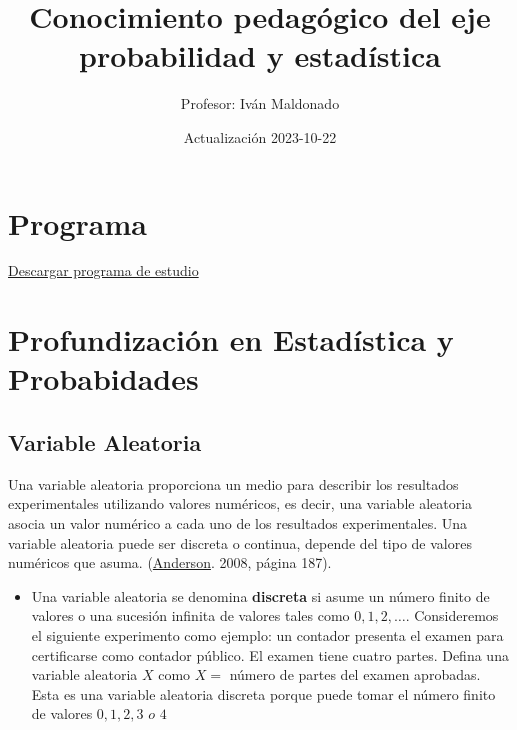 \documentclass[
]{book}
\title{Conocimiento pedagógico del eje probabilidad y estadística}
\author{Profesor: Iván Maldonado}
\date{Actualización 2023-10-22}
\providecommand{\tightlist}{%
  \setlength{\itemsep}{0pt}\setlength{\parskip}{0pt}}
\begin{document}
\maketitle

{
\setcounter{tocdepth}{1}
\tableofcontents
}
\hypertarget{programa}{%
\chapter*{Programa}\label{programa}}

\href{https://correouss-my.sharepoint.com/:b:/g/personal/imaldonadoc1_docente_uss_cl/EXfiKuJSO7JCle9L_86S0EMBeDkr3OyYHprvy0Rc0Jj4mQ?e=JcPOWy}{Descargar programa de estudio}

\hypertarget{profundizaciuxf3n-en-estaduxedstica-y-probabidades}{%
\chapter{Profundización en Estadística y Probabidades}\label{profundizaciuxf3n-en-estaduxedstica-y-probabidades}}

\hypertarget{variable-aleatoria}{%
\section{Variable Aleatoria}\label{variable-aleatoria}}

Una variable aleatoria proporciona un medio para describir los resultados experimentales utilizando valores numéricos, es decir, una variable aleatoria asocia un valor numérico a cada uno de los resultados experimentales. Una variable aleatoria puede ser discreta o continua, depende del tipo de valores numéricos que asuma. (\protect\hyperlink{ux5cux2520Referencias}{Anderson}. 2008, página 187).

\begin{itemize}
\tightlist
\item
  Una variable aleatoria se denomina \textbf{discreta} si asume un número finito de valores o una sucesión infinita de valores tales como \(0,1,2,\ldots\). Consideremos el siguiente experimento como ejemplo: un contador presenta el examen para certificarse como contador público. El examen tiene cuatro partes. Defina una variable aleatoria \(X\) como \(X =\) número de partes del examen aprobadas. Esta es una variable aleatoria discreta porque puede tomar el número finito de valores \(0,1,2,3\,\,o \,\, 4\)
\end{itemize}
\end{document}
